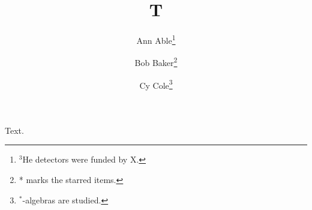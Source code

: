 \documentclass{article}
\title{T}
\author{Ann Able\thanks{$^{3}$He detectors were funded by X.} \and Bob Baker\thanks{* marks the starred items.} \and Cy Cole\thanks{$^*$-algebras are studied.}}
\date{}
\begin{document}
\maketitle
Text.
\end{document}
